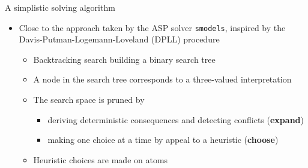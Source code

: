 \begin{frame}{A simplistic solving algorithm}
\bigskip
\begin{itemize}
  \item Close to the approach taken by the ASP solver \texttt{smodels},
    inspired by the Davis-Putman-Logemann-Loveland (DPLL) procedure
    \smallskip
  \begin{itemize}
  \item<2-> Backtracking search building a binary search tree
  \item<2-> A node in the search tree corresponds to a three-valued interpretation
    \smallskip
  \item<3-> The search space is pruned by
    \begin{itemize}
    \item deriving deterministic consequences and detecting conflicts (\textbf{expand})
    \item making one choice at a time by appeal to a heuristic (\textbf{choose})
    \end{itemize}
    \smallskip
  \item<4-> Heuristic choices are made on atoms
  \end{itemize}
\end{itemize}
\end{frame}
%

